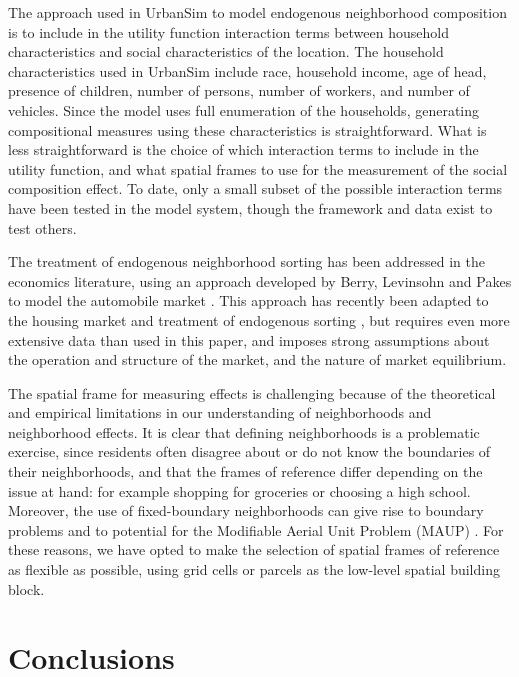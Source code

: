 \documentclass[12pt,a4paper]{article}
\begin{document}
The approach used in UrbanSim to model endogenous neighborhood
composition is to include in the utility function interaction terms
between household characteristics and social characteristics of the
location.  The household characteristics used in UrbanSim include
race, household income, age of head, presence of children, number of
persons, number of workers, and number of vehicles.  Since the model
uses full enumeration of the households, generating compositional
measures using these characteristics is straightforward. What is
less straightforward is the choice of which interaction terms to
include in the utility function, and what spatial frames to use for
the measurement of the social composition effect.  To date, only a
small subset of the possible interaction terms have been tested in
the model system, though the framework and data exist to test
others.

The treatment of endogenous neighborhood sorting has been addressed
in the economics literature, using an approach developed by Berry,
Levinsohn and Pakes to model the automobile market
\cite{berry-econometrica-1995,berry-cowles-2003}. This approach has
recently been adapted to the housing market and treatment of
endogenous sorting
\cite{bajari-kahn-stanford-working-papers-2002,bayer-mcmillan-rueben-2003},
but requires even more extensive data than used in this paper, and
imposes strong assumptions about the operation and structure of the
market, and the nature of market equilibrium.  

The spatial frame for measuring effects is challenging because of
the theoretical and empirical limitations in our understanding of
neighborhoods and neighborhood effects.  It is clear that defining
neighborhoods is a problematic exercise, since residents often
disagree about or do not know the boundaries of their neighborhoods,
and that the frames of reference differ depending on the issue at
hand: for example shopping for groceries or choosing a high school.
Moreover, the use of fixed-boundary neighborhoods can give rise to
boundary problems and to potential for the Modifiable Aerial Unit
Problem (MAUP) \cite{openshaw-taylor-1981}. For these reasons, we
have opted to make the selection of spatial frames of reference as
flexible as possible, using grid cells or parcels as the low-level
spatial building block.


\section{Conclusions}
\end{document}
